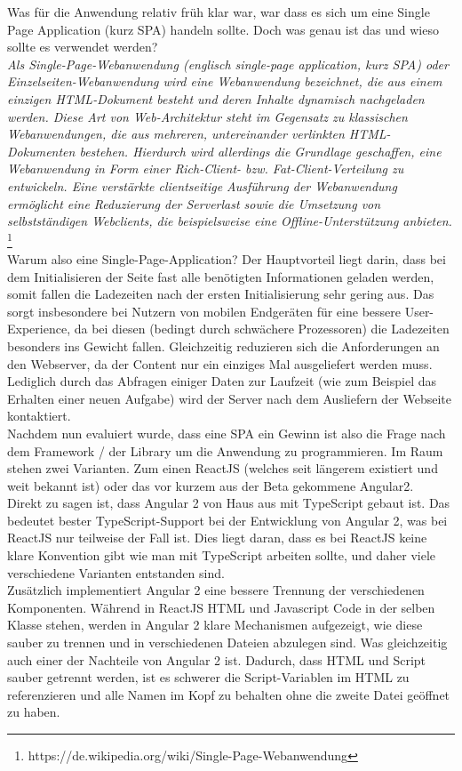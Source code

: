 Was für die Anwendung relativ früh klar war, war dass es sich um eine Single Page Application (kurz SPA) handeln sollte. Doch was genau ist das und wieso sollte es verwendet werden? \\


\emph{\glqq   
Als Single-Page-Webanwendung (englisch single-page application, kurz SPA) oder Einzelseiten-Webanwendung wird eine Webanwendung bezeichnet, die aus einem einzigen HTML-Dokument besteht und deren Inhalte dynamisch nachgeladen werden. Diese Art von Web-Architektur steht im Gegensatz zu klassischen Webanwendungen, die aus mehreren, untereinander verlinkten HTML-Dokumenten bestehen. Hierdurch wird allerdings die Grundlage geschaffen, eine Webanwendung in Form einer Rich-Client- bzw. Fat-Client-Verteilung zu entwickeln. Eine verstärkte clientseitige Ausführung der Webanwendung ermöglicht eine Reduzierung der Serverlast sowie die Umsetzung von selbstständigen Webclients, die beispielsweise eine Offline-Unterstützung anbieten.
\grqq} \footnote{https://de.wikipedia.org/wiki/Single-Page-Webanwendung} \\

Warum also eine Single-Page-Application? Der Hauptvorteil liegt darin, dass bei dem Initialisieren der Seite fast alle benötigten Informationen geladen werden, somit fallen die Ladezeiten nach der ersten Initialisierung sehr gering aus. Das sorgt insbesondere bei Nutzern von mobilen Endgeräten für eine bessere User-Experience, da bei diesen (bedingt durch schwächere Prozessoren) die Ladezeiten besonders ins Gewicht fallen. Gleichzeitig reduzieren sich die Anforderungen an den Webserver, da der Content nur ein einziges Mal ausgeliefert werden muss. Lediglich durch das Abfragen einiger Daten zur Laufzeit (wie zum Beispiel das Erhalten einer neuen Aufgabe) wird der Server nach dem Ausliefern der Webseite kontaktiert.\\

Nachdem nun evaluiert wurde, dass eine SPA ein Gewinn ist also die Frage nach dem Framework / der Library um die Anwendung zu programmieren. Im Raum stehen zwei Varianten. Zum einen ReactJS (welches seit längerem existiert und weit bekannt ist) oder das vor kurzem aus der Beta gekommene Angular2. \\
Direkt zu sagen ist, dass Angular 2 von Haus aus mit TypeScript gebaut ist. Das bedeutet bester TypeScript-Support bei der Entwicklung von Angular 2, was bei ReactJS nur teilweise der Fall ist. Dies liegt daran, dass es bei ReactJS keine klare Konvention gibt wie man mit TypeScript arbeiten sollte, und daher viele verschiedene Varianten entstanden sind. \\
Zusätzlich implementiert Angular 2 eine bessere Trennung der verschiedenen Komponenten. Während in ReactJS HTML und Javascript Code in der selben Klasse stehen, werden in Angular 2 klare Mechanismen aufgezeigt, wie diese sauber zu trennen und in verschiedenen Dateien abzulegen sind. Was gleichzeitig auch einer der Nachteile von Angular 2 ist. Dadurch, dass HTML und Script sauber getrennt werden, ist es schwerer die Script-Variablen im HTML zu referenzieren und alle Namen im Kopf zu behalten ohne die zweite Datei geöffnet zu haben. \\

